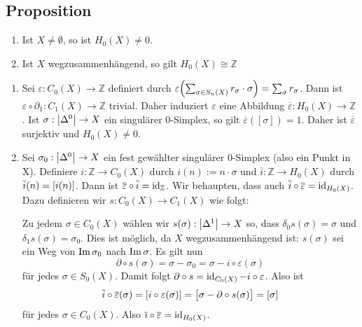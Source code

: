 \subsection{Proposition} %
\label{sub:510}
\begin{enumerate}[1)]
	\item Ist $X \not= \emptyset$, so ist $H_0(X) \not=0$.
	\item Ist $X$ wegzusammenhängend, so gilt $H_0(X) \cong \mathds{Z}$
\end{enumerate}
\begin{enumerate}[1)]
	\item Sei $\varepsilon : C_0(X) \to \mathds{Z}$ definiert durch $\varepsilon \enbrace*{\sum_{\sigma \in S_n(X)}r_\sigma \cdot \sigma } = \sum_\sigma r_\sigma$.
	Dann ist $\varepsilon \circ \partial_1 : C_1(X) \to \mathds{Z}$ trivial. Daher induziert $\varepsilon$ eine Abbildung 
	$\overline{\varepsilon} : H_0(X) \to \mathds{Z}$. Ist $\sigma : \abs*{\Delta^0} \to X$ ein singulärer $0$-Simplex, so gilt $\overline{\varepsilon}( [\sigma])=1$.
	Daher ist $\overline{\varepsilon}$ surjektiv und $H_0(X) \not= 0$.
	\item Sei $\sigma_0 : \abs*{\Delta^0} \to X$ ein fest gewählter singulärer $0$-Simplex (also ein Punkt in X). Definiere $i : \mathds{Z} \to C_0(X)$ durch
	$i(n) := n \cdot \sigma$ und $\overline{i} : \mathds{Z} \to H_0(X)$ durch $\overline{i}(n) = \benbrace*{i(n)}$. Dann ist 
	$\overline{\varepsilon}\circ\overline{i} = \id_\mathds{Z}$. Wir behaupten, dass auch $\overline{i} \circ \overline{\varepsilon}= \id_{H_0(X)}$. Dazu definieren
	wir $s : C_0(X) \to C_1(X)$ wie folgt:
	
	Zu jedem $\sigma \in C_0(X)$ wählen wir $s(\sigma) : \abs*{\Delta^1} \to X$ so, dass $\delta_0 s(\sigma) = \sigma$ und $\delta_1 s(\sigma)= \sigma_0$.
	Dies ist möglich, da $X$ wegzusammenhängend ist: $s(\sigma)$ sei ein Weg von $\im \sigma_0$ nach $\im \sigma$. Es gilt nun
	\[
		\partial \circ s (\sigma) = \sigma - \sigma_0 = \sigma- i \circ \varepsilon(\sigma)
	\]
	für jedes $\sigma \in S_0(X)$. Damit folgt $\partial \circ s = \id_{C_0(X)} - i \circ \varepsilon$. Also ist
	\[
		\overline{i} \circ \overline{\varepsilon} (\sigma) = \benbrace*{i \circ \varepsilon(\sigma)} = \benbrace[\big]{\sigma - \partial \circ s(\sigma)} = [\sigma]
	\]
	für jedes $\sigma \in C_0(X)$. Also $\overline{\imath} \circ \overline{\varepsilon} = \id_{H_0(X)}$. \bewende
\end{enumerate}

\cleardoubleoddemptypage
{}
\setcounter{page}{1}
\printindex
\listoffigures
\todototoc
{}

